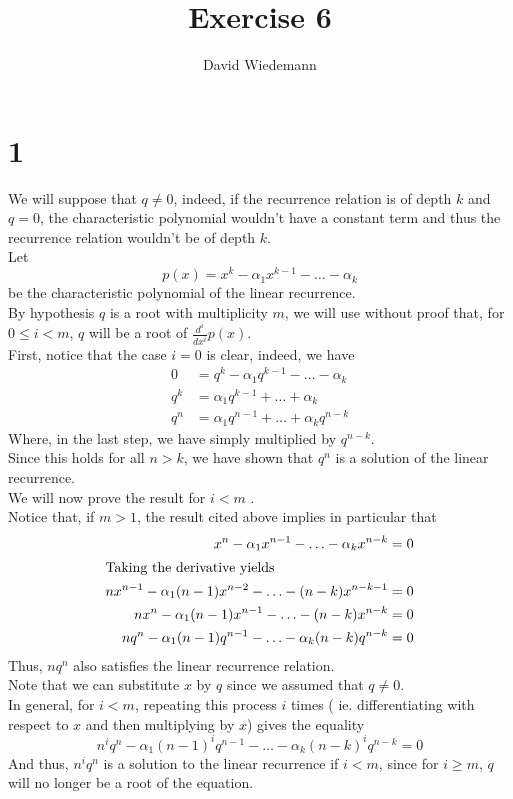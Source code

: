 \documentclass[11pt, a4paper]{article}
\begin{document}
\title{Exercise 6}
\author{David Wiedemann}
\maketitle
\section*{1}
We will suppose that $q\neq 0$, indeed, if the recurrence relation is of depth $k$ and $q=0$, the characteristic polynomial wouldn't have a constant term and thus the recurrence relation wouldn't be of depth $k$.\\
Let 
\[ 
	p( x) = x^{k}- \alpha_1 x^{k-1} - \ldots - \alpha_{k} 
\]
be the characteristic polynomial of the linear recurrence.\\
By hypothesis $q$ is a root with multiplicity $m$, we will use without proof that, for $0\leq i<m$,  $q$ will be a root of $ \frac{d^{i}}{dx^{i}}p( x) $.\\
First, notice that the case $i=0$ is clear, indeed, we have
\begin{align*}
	 0 &=q^{k} - \alpha_1 q^{k-1} - \ldots - \alpha_k \\
	q^{k}&= \alpha_1 q^{k-1} + \ldots + \alpha_k\\
	q^{n} &= \alpha_1 q^{n-1} + \ldots + \alpha_k q^{n-k}
\end{align*}
Where, in the last step, we have simply multiplied by $q^{n-k}$.\\
Since this holds for all $n>k$, we have shown that $q^{n}$ is a solution of the linear recurrence.\\
We will now prove the result for $i<m$ .\\
Notice that, if $m> 1$, the result cited above implies in particular that
\begin{align*}
	x^{n} - \alpha_1 x^{n-1}- \ldots - \alpha_k x^{n-k}&=0\\
	\intertext{Taking the derivative yields}
	n x^{n-1} - \alpha_1( n-1)  x^{n-2} - \ldots - ( n-k) x^{n-k-1} &= 0\\
	nx^{n}- \alpha_1( n-1)  x^{n-1} - \ldots - ( n-k) x^{n-k} &= 0\\
	n q^{n} - \alpha_1 ( n-1) q^{n-1} - \ldots - \alpha_k( n-k) q^{n-k} &= 0\\
\end{align*}
Thus,  $nq^{n}$ also satisfies the linear recurrence relation.\\
Note that we can substitute $x $ by $q$ since we assumed that $q\neq 0$.\\
In general, for $i<m$, repeating this process $i$ times ( ie. differentiating with respect to $x$ and then multiplying by $x$) gives the equality
\[ 
	n^{i}q^{n} - \alpha_1 ( n-1) ^{i} q^{n-1} - \ldots - \alpha_k ( n-k)^{i}  q^{n-k}=0
\]
And thus, $n^{i}q^{n}$ is a solution to the linear recurrence if $i<m$, since for $i \geq m$, $q$ will no longer be a root of the equation.\\
\end{document}
